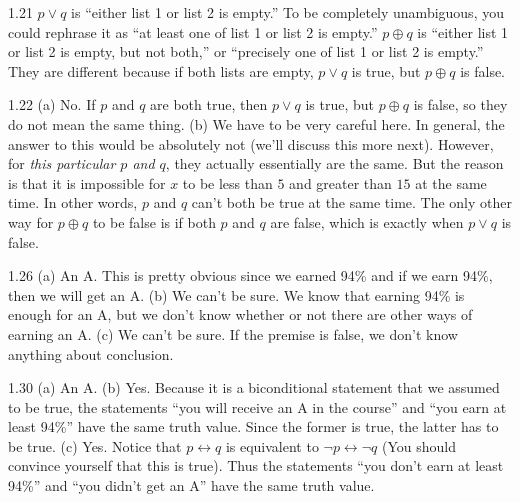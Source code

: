 \begin{Answer}{1.21}
$p\vee q$ is ``either list 1 or list 2 is empty.''  To be completely unambiguous,
you could rephrase it as ``at least one of list 1 or list 2 is empty.''
$p\oplus q$ is ``either list 1 or list 2 is empty, but not both,'' or
``precisely one of list 1 or list 2 is empty.''
They are different because if both lists are empty, $p\vee q$ is true, but $p\oplus q$ is false.
\end{Answer}
\begin{Answer}{1.22}
(a) No.  If $p$ and $q$ are both true, then $p\vee q$ is true, but $p\oplus q$ is false, so they do not mean the same thing.
(b) We have to be very careful here.  In general, the answer to this would be absolutely not
(we'll discuss this more next).
However, for {\em this particular $p$ and $q$}, they actually essentially are the same.
But the reason is that it is impossible for $x$ to be less than $5$ and greater than $15$ at
the same time.  In other words, $p$ and $q$ can't both be true at the same time.
The only other way for $p\oplus q$ to be false is if both $p$ and $q$ are false, which is
exactly when $p\vee q$ is false.
\end{Answer}
\begin{Answer}{1.26}
(a) An A. This is pretty obvious since we earned 94\% and if we
earn 94\%, then we will get an A.
(b) We can't be sure.  We know that earning 94\% is enough for an A, but we don't know
whether or not there are other ways of earning an A.
(c) We can't be sure.  If the premise is false, we don't know anything about conclusion.
\end{Answer}
\begin{Answer}{1.30}
(a) An A.
(b) Yes. Because it is a biconditional statement that we assumed to be true,
the statements ``you will receive an A in the course'' and ``you earn at least 94\%'' have the
same truth value.  Since the former is true, the latter has to be true.
(c) Yes.  Notice that $p\leftrightarrow q$ is equivalent to $\neg p \leftrightarrow \neg q$
(You should convince yourself that this is true).
Thus the statements ``you don't earn at least 94\%'' and ``you didn't get an A'' have the same
truth value.
\end{Answer}
